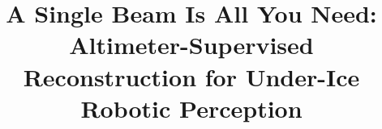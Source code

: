 \documentclass[conference]{IEEEtran}
\begin{document}
\title{A Single Beam Is All You Need: Altimeter-Supervised Reconstruction for Under-Ice Robotic Perception}

\maketitle
\end{document}
